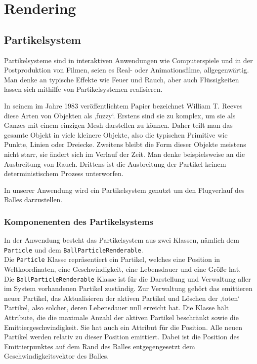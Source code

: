 
\chapter{Rendering}
\label{Kapitel 2}
%

\section{Partikelsystem}
\label{Kapitel_2_-_Unterkapitel_1}
%
Partikelsysteme sind in interaktiven Anwendungen wie Computerspiele und in der Postproduktion von Filmen, seien es Real- oder Animationsfilme, allgegenwärtig.
Man denke an typische Effekte wie Feuer und Rauch, aber auch Flüssigkeiten lassen sich mithilfe von Partikelsystemen realisieren.

In seinem im Jahre 1983 veröffentlichtem Papier bezeichnet William T. Reeves diese Arten von Objekten als ‚fuzzy‘. Erstens sind sie zu komplex, um sie als Ganzes mit einem einzigen Mesh darstellen zu können. Daher teilt man das gesamte Objekt in viele kleinere Objekte, also die typischen Primitive wie Punkte, Linien oder Dreiecke. Zweitens bleibt die Form dieser Objekte meistens nicht starr, sie ändert sich im Verlauf der Zeit. Man denke beispielsweise an die Ausbreitung von Rauch. Drittens ist die Ausbreitung der Partikel keinem deterministischem Prozess unterworfen.

In unserer Anwendung wird ein Partikelsystem genutzt um den Flugverlauf des Balles darzustellen. 

\subsection{Komponenenten des Partikelsystems}
\label{Kapitel_2_-_Unterkapitel_1.1}
%
In der Anwendung besteht das Partikelsystem aus zwei Klassen, nämlich dem {\texttt{Particle}} und dem {\texttt{BallParticleRenderable}}.\\
Die {\texttt{Particle}} Klasse repräsentiert ein Partikel, welches eine Position in Weltkoordinaten, eine Geschwindigkeit, eine Lebensdauer und eine Größe hat. 
Die {\texttt{BallParticleRenderable}} Klasse ist für die Darstellung und Verwaltung aller im System vorhandenen Partikel zuständig. Zur Verwaltung gehört das emittieren neuer Partikel, das Aktualisieren der aktiven Partikel und Löschen der ‚toten‘ Partikel, also solcher, deren Lebensdauer null erreicht hat. Die Klasse hält Attribute, die die maximale Anzahl der aktiven Partikel beschränkt sowie die Emittiergeschwindigkeit.  Sie hat auch ein Attribut für die Position. Alle neuen Partikel werden relativ zu dieser Position emittiert. Dabei ist die Position des Emittierpunktes auf dem Rand des Balles entgegengesetzt dem Geschwindigkeitsvektor des Balles.

